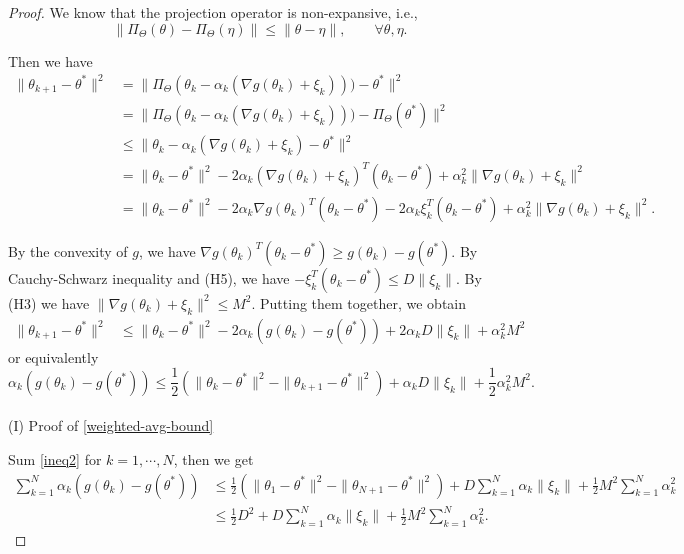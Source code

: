 \documentclass[psamsfonts]{article}
\theoremstyle{definition}
\theoremstyle{remark}
\numberwithin{equation} {section}
\begin{document}
\begin{proof}
We know that the projection operator is non-expansive, i.e.,
\[
\| \Pi_\Theta(\theta) - \Pi_\Theta(\eta) \| \le \| \theta - \eta \|, \qquad \forall \theta, \eta.
\]

Then we have
\begin{equation}\label{ineq0}
\begin{aligned}
\| \theta_{k + 1} - \theta^* \|^2 & = \| \Pi_\Theta(\theta_k - \alpha_k (\nabla g(\theta_k) + \xi_k))) - \theta^* \|^2 \\
& = \| \Pi_\Theta(\theta_k - \alpha_k (\nabla g(\theta_k) + \xi_k))) - \Pi_\Theta(\theta^*) \|^2\\
& \le \| \theta_k - \alpha_k (\nabla g(\theta_k) + \xi_k) - \theta^* \|^2\\
& = \| \theta_k - \theta^* \|^2 - 2\alpha_k (\nabla g(\theta_k) + \xi_k)^T (\theta_k - \theta^*) + \alpha_k^2 \|\nabla g(\theta_k) + \xi_k\|^2\\
& = \| \theta_k - \theta^* \|^2 - 2\alpha_k \nabla g(\theta_k)^T (\theta_k - \theta^*) - 2\alpha_k \xi_k^T(\theta_k - \theta^*) + \alpha_k^2 \|\nabla g(\theta_k) + \xi_k\|^2.
\end{aligned}
\end{equation}

By the convexity of $g$, we have $\nabla g(\theta_k)^T (\theta_k - \theta^*) \ge g(\theta_k) - g(\theta^*)$. By Cauchy-Schwarz inequality and (H5), we have $-\xi_k^T(\theta_k - \theta^*) \le D \|\xi_k\|$. By (H3) we have $\|\nabla g(\theta_k) + \xi_k\|^2 \le M^2$. Putting them together, we obtain
\begin{equation}\label{ineq1}
\begin{aligned}
\| \theta_{k + 1} - \theta^* \|^2 & \le \| \theta_k - \theta^* \|^2 - 2\alpha_k (g(\theta_k) - g(\theta^*)) + 2\alpha_k D \|\xi_k\| + \alpha_k^2 M^2
\end{aligned}
\end{equation}
or equivalently
\begin{equation}\label{ineq2}
\alpha_k (g(\theta_k) - g(\theta^*))  \le \frac{1}{2} (\|\theta_k - \theta^* \|^2 - \| \theta_{k+1} - \theta^* \|^2)  + \alpha_k D \|\xi_k\| + \frac{1}{2}\alpha_k^2 M^2.
\end{equation}\\
(I) Proof of \eqref{weighted-avg-bound}

Sum \eqref{ineq2} for $k=1, \cdots, N$, then we get
\begin{equation*}
\begin{aligned}
\sum_{k=1}^N \alpha_k (g(\theta_k) - g(\theta^*)) &\le \frac{1}{2} (\|\theta_1 - \theta^* \|^2 - \| \theta_{N+1} - \theta^* \|^2) + D\sum_{k=1}^N \alpha_k \|\xi_k\| + \frac{1}{2}M^2\sum_{k=1}^N \alpha_k^2\\
&\le \frac{1}{2}D^2 + D\sum_{k=1}^N \alpha_k \|\xi_k\| + \frac{1}{2}M^2\sum_{k=1}^N \alpha_k^2.
\end{aligned}
\end{equation*}


\end{proof}
\end{document}
